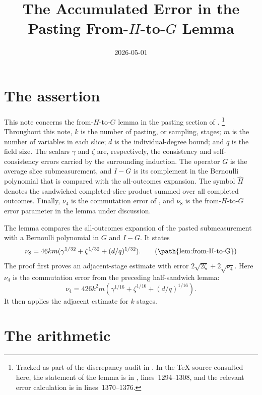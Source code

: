 \documentclass[11pt]{article}
\title{The Accumulated Error in the Pasting From-\texorpdfstring{$H$}{H}-to-\texorpdfstring{$G$}{G} Lemma}
\author{}
\date{2026-05-01}
\begin{document}
\maketitle

\section{The assertion}

This note concerns the from-$H$-to-$G$ lemma in the pasting section of
\cite{Ji2020LowIndividualDegree}.%
\footnote{Tracked as part of the discrepancy audit in . In the
TeX source consulted here, the statement of the lemma is in
, lines~1294--1308, and the relevant
error calculation is in lines~1370--1376.}
Throughout this note, $k$ is the number of pasting, or sampling, stages;
$m$ is the number of variables in each slice; $d$ is the individual-degree
bound; and $q$ is the field size. The scalars $\gamma$ and $\zeta$ are,
respectively, the consistency and self-consistency errors carried by the
surrounding induction. The operator $G$ is the average slice submeasurement, and
$I-G$ is its complement in the Bernoulli polynomial that is compared with the
all-outcomes expansion. The symbol $\widehat H$ denotes the sandwiched
completed-slice product summed over all completed outcomes. Finally, $\nu_4$ is
the commutation error of , and $\nu_8$ is the
from-$H$-to-$G$ error parameter in the lemma under discussion.

The lemma compares the all-outcomes expansion of the pasted submeasurement with
a Bernoulli polynomial in $G$ and $I-G$. It states
\[
  \nu_8
  = 46km(\gamma^{1/32}+\zeta^{1/32}+(d/q)^{1/32}).
  \tag{\path{lem:from-H-to-G}}
\]
The proof first proves an adjacent-stage estimate with error
$2\sqrt{2\zeta}+2\sqrt{\nu_4}$.  Here $\nu_4$ is the commutation error from the
preceding half-sandwich lemma:
\[
  \nu_4
  =426k^2m(\gamma^{1/16}+\zeta^{1/16}+(d/q)^{1/16}).
\]
It then applies the adjacent estimate for $k$ stages.

\section{The arithmetic}
\end{document}
